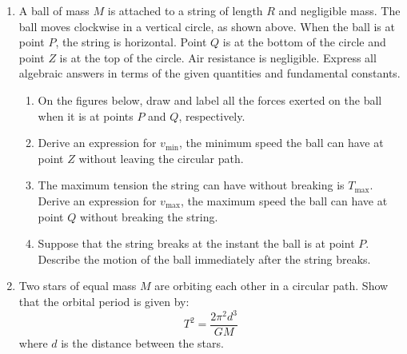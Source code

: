 \documentclass{../../../oss-classkick}
\begin{document}
\begin{enumerate}[leftmargin=15pt]
\item A ball of mass $M$ is attached to a string of length $R$ and negligible
  mass. The ball moves clockwise in a vertical circle, as shown above. When the
  ball is at point $P$, the string is horizontal. Point $Q$ is at the bottom of
  the circle and point $Z$ is at the top of the circle. Air resistance is
  negligible. Express all algebraic answers in terms of the given quantities
  and fundamental constants.
  \begin{enumerate}[nosep]
  \item On the figures below, draw and label all the forces exerted on the ball
    when it is at points $P$ and $Q$, respectively.
    \begin{center}
      \hspace{1in}
    \end{center}
    \vspace{.3in}
  \item Derive an expression for $v_\mathrm{min}$, the minimum speed the ball
    can have at point $Z$ without leaving the circular path.
  \item The maximum tension the string can have without breaking is
    $T_\text{max}$. Derive an expression for $v_\text{max}$, the maximum speed
    the ball can have at point $Q$ without breaking the string.
  \item Suppose that the string breaks at the instant the ball is at point $P$.
    Describe the motion of the ball immediately after the string breaks.
  \end{enumerate}
  \newpage
  
\item Two stars of equal mass $M$ are orbiting each other in a circular path.
  Show that the orbital period is given by:
  \begin{displaymath}
    T^2=\frac{2\pi^2d^3}{GM}
  \end{displaymath}
  where $d$ is the distance between the stars.
  

\end{enumerate}
\end{document}
